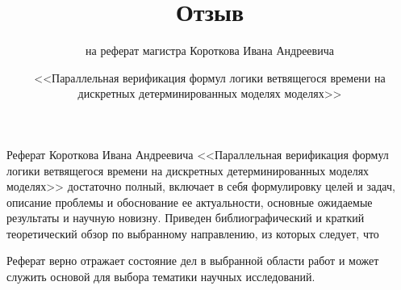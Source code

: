 \documentclass[a4paper,12pt,notitlepage]{article}
\title{Отзыв}
\date{\normalsize{<<Параллельная верификация формул логики ветвящегося времени на
    дискретных детерминированных моделях моделях>>}}
\author{\small{на реферат магистра Короткова Ивана Андреевича}}
\begin{document}
\maketitle

\thispagestyle{empty}

Реферат Короткова Ивана Андреевича <<Параллельная верификация формул логики ветвящегося
времени на дискретных детерминированных моделях моделях>> достаточно полный, включает в
себя формулировку целей и задач, описание проблемы и обоснование ее актуальности, основные
ожидаемые результаты и научную новизну. Приведен библиографический и краткий теоретический
обзор по выбранному направлению, из которых следует, что 

Реферат верно отражает состояние дел в выбранной области работ и может служить основой для
выбора тематики научных исследований.
\end{document}
